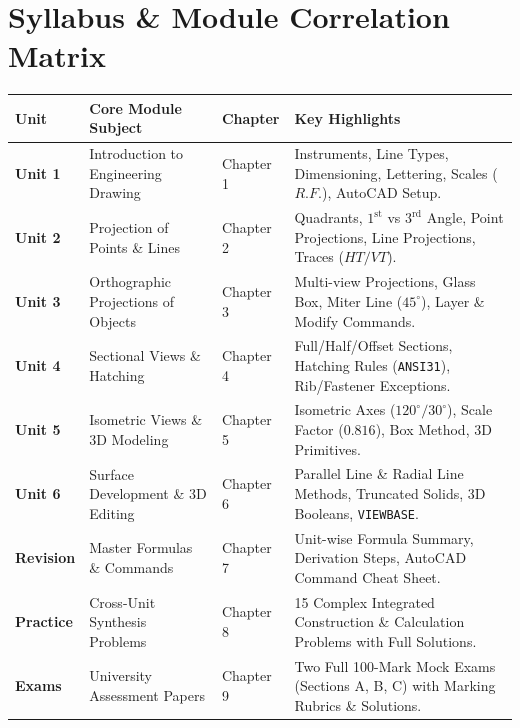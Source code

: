 \documentclass[a4paper,11pt,oneside,openany]{book}
\begin{document}
\section*{Syllabus \& Module Correlation Matrix}
\begin{table}[htbp]
\centering
\small
\begin{tabularx}{\textwidth}{lp{5.2cm}p{2.2cm}X}
\toprule
\textbf{Unit} & \textbf{Core Module Subject} & \textbf{Chapter} & \textbf{Key Highlights} \\
\midrule
\textbf{Unit 1} & Introduction to Engineering Drawing & Chapter 1 & Instruments, Line Types, Dimensioning, Lettering, Scales ($R.F.$), AutoCAD Setup. \\
\addlinespace
\textbf{Unit 2} & Projection of Points \& Lines & Chapter 2 & Quadrants, $1^{\text{st}}$ vs $3^{\text{rd}}$ Angle, Point Projections, Line Projections, Traces ($HT/VT$). \\
\addlinespace
\textbf{Unit 3} & Orthographic Projections of Objects & Chapter 3 & Multi-view Projections, Glass Box, Miter Line ($45^\circ$), Layer \& Modify Commands. \\
\addlinespace
\textbf{Unit 4} & Sectional Views \& Hatching & Chapter 4 & Full/Half/Offset Sections, Hatching Rules (\texttt{ANSI31}), Rib/Fastener Exceptions. \\
\addlinespace
\textbf{Unit 5} & Isometric Views \& 3D Modeling & Chapter 5 & Isometric Axes ($120^\circ/30^\circ$), Scale Factor ($0.816$), Box Method, 3D Primitives. \\
\addlinespace
\textbf{Unit 6} & Surface Development \& 3D Editing & Chapter 6 & Parallel Line \& Radial Line Methods, Truncated Solids, 3D Booleans, \texttt{VIEWBASE}. \\
\addlinespace
\textbf{Revision} & Master Formulas \& Commands & Chapter 7 & Unit-wise Formula Summary, Derivation Steps, AutoCAD Command Cheat Sheet. \\
\addlinespace
\textbf{Practice} & Cross-Unit Synthesis Problems & Chapter 8 & 15 Complex Integrated Construction \& Calculation Problems with Full Solutions. \\
\addlinespace
\textbf{Exams} & University Assessment Papers & Chapter 9 & Two Full 100-Mark Mock Exams (Sections A, B, C) with Marking Rubrics \& Solutions. \\
\bottomrule
\end{tabularx}
\end{table}

\clearpage

\tableofcontents
\cleardoublepage
\end{document}
